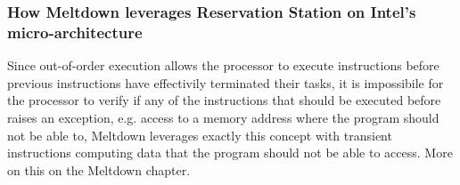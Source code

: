 \subsubsection{How Meltdown leverages Reservation Station on Intel's micro-architecture}
Since out-of-order execution allows the processor to execute instructions before previous instructions have effectivily terminated their tasks, it is impossibile
for the processor to verify if any of the instructions that should be executed before raises an exception, e.g. access to a memory address where the program
should not be able to, Meltdown leverages exactly this concept with transient instructions computing data that the program should not be able to access. More on this
on the Meltdown chapter.

